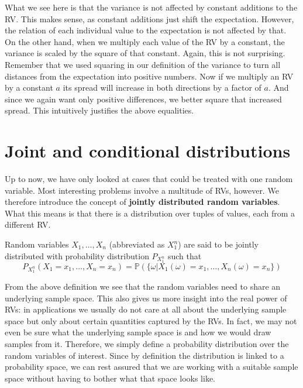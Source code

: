 \documentclass[a4paper,11pt,leqno]{report}
\begin{document}
What we see here is that the variance is not affected by constant additions to the RV. This makes sense, as constant additions just shift
the expectation. However, the relation of each individual value to the expectation is not affected by that. On the other hand,
when we multiply each value of the RV by a constant, the variance is scaled by the square of that constant. Again, this is not surprising.
Remember that we used squaring in our definition of the variance to turn all distances from the expectation into positive numbers.
Now if we multiply an RV by a constant $ a $ its spread will increase in both directions by a factor of $ a $. 
And since we again want only positive differences,
we better square that increased spread. This intuitively justifies the above equalities.



\section{Joint and conditional distributions}

Up to now, we have only looked at cases that could be treated with one random variable. Most interesting problems involve a multitude
of RVs, however. We therefore introduce the concept of \textbf{jointly distributed random variables}. What this means is that
there is a distribution over tuples of values, each from a different RV.

\begin{Definition}
Random variables $ X_{1}, \ldots, X_{n} $ (abbreviated as $ X^{n}_{1} $) 
are said to be jointly distributed with probability distribution $ P_{X_{1}^{n}} $ such that
$$ P_{X^{n}_{1}}(X_{1}=x_{1}, \ldots, X_{n}=x_{n}) = \mathbb{P}(\{\omega|X_{1}(\omega) = x_{1}, \ldots, X_{n}(\omega)=x_{n}\}) $$
\end{Definition}

From the above definition we see that the random variables need to share an underlying sample space. This also gives us more
insight into the real power of RVs: in applications we usually do not care at all about the underlying sample space but only about
certain quantities captured by the RVs. In fact, we may not even be sure what the underlying sample space is and how we would
draw samples from it. Therefore, we simply define a probability distribution over the random variables of interest. Since by definition
the distribution is linked to a probability space, we can rest assured that we are working with a suitable sample space without
having to bother what that space looks like.
\end{document}
